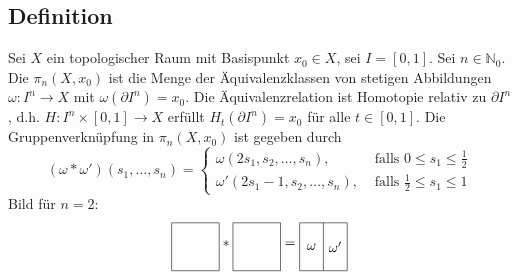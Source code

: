 \subsection{Definition} %
\label{sub:1514}
Sei $X$ ein topologischer Raum mit Basispunkt $x_0 \in X$, sei $I=[0,1]$. Sei $n \in \mathds{N}_0$. Die 
$\pi_n(X,x_0)$ ist die Menge der Äquivalenzklassen von stetigen Abbildungen $\omega\colon I^n \to X$ mit $\omega(\partial I^n)=x_0$. Die Äquivalenzrelation ist Homotopie 
relativ zu $\partial I^n$, d.h. $H \colon I^n \times [0,1] \to X$ erfüllt $H_t(\partial I^n)= x_0$ für alle $t \in [0,1]$. Die Gruppenverknüpfung in $\pi_n(X,x_0)$ ist
gegeben durch 
\[
	(\omega * \omega')(s_1,\ldots ,s_n) = \begin{cases}
		\omega(2s_1, s_2, \ldots ,s_n), &\text{ falls }0\le s_1 \le \frac{1}{2} \\
		\omega'(2s_1 -1, s_2, \ldots , s_n) ,&\text{ falls } \frac{1}{2} \le s_1 \le 1
	\end{cases}
\]
Bild für $n=2$:
\[	
	\begin{tikzpicture}[baseline={(current bounding box.center)},scale=1.2]
		\draw (0,0) rectangle (1,1);
	\end{tikzpicture}
	 * 
 	\begin{tikzpicture}[baseline={(current bounding box.center)},scale=1.2]
 		\draw (0,0) rectangle (1,1);
 	\end{tikzpicture}
	= 
	\begin{tikzpicture}[baseline={(current bounding box.center)},scale=1.2]
		\draw (0,0) rectangle (1,1);
		\draw (0.5,0) -- (0.5,1);
		\node at (0.25,0.5) {$\omega$};
		\node at (0.75,0.5) {$\omega^\prime$};
	\end{tikzpicture}
\]

